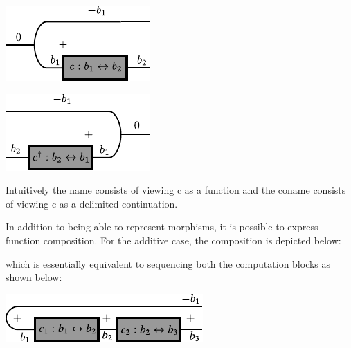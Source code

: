 \documentclass[preprint]{sigplanconf}
\begin{document}
\begin{multicols}{2}
\begin{center}
  \includegraphics{diagrams/function.pdf}
\end{center}

\begin{center}
  \includegraphics{diagrams/delimc.pdf}
\end{center}  
\end{multicols}

Intuitively the name consists of viewing {{c}} as a function and the coname
consists of viewing {{c}} as a delimited continuation.

In addition to being able to represent morphisms, it is possible to express
function composition. For the additive case, the composition is depicted
below:

\begin{multicols}{2}

\end{multicols}
which is essentially equivalent to sequencing both the computation blocks as
shown below:

\begin{center}
  \includegraphics{diagrams/compose2.pdf}
\end{center}
\end{document}
